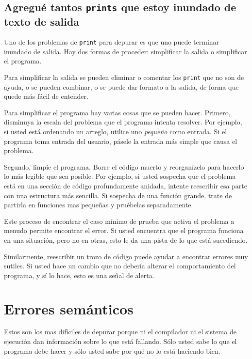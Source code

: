 \subsection{Agregué tantos \texttt{prints} que estoy inundado de texto de salida}

 

Uno de los problemas de \texttt{print} para depurar es que uno puede
terminar inundado de salida. Hay dos formas de proceder: simplificar
la salida o simplificar el programa.

Para simplificar la salida se pueden eliminar o comentar los \texttt{print}
que no son de ayuda, o se pueden combinar, o se puede dar formato
a la salida, de forma que quede más fácil de entender.

Para simplificar el programa hay varias cosas que se pueden hacer.
Primero, disminuya la escala del problema que el programa intenta
resolver. Por ejemplo, si usted está ordenando un arreglo, utilice
uno {\em pequeño} como entrada. Si el programa toma entrada del
usuario, pásele la entrada más simple que causa el problema.

Segundo, limpie el programa. Borre el código muerto y reorganízelo
para hacerlo lo más legible que sea posible. Por ejemplo, si usted
sospecha que el problema está en una sección de código profundamente
anidada, intente reescribir esa parte con una estructura más sencilla.
Si sospecha de una función grande, trate de partirla en funciones
mas pequeñas y pruébelas separadamente.

Este proceso de encontrar el caso mínimo de prueba que activa el problema
a menudo permite encontrar el error. Si usted encuentra que el programa
funciona en una situación, pero no en otras, esto le da una pista
de lo que está sucediendo.

Similarmente, reescribir un trozo de código puede ayudar a encontrar
errores muy sutiles. Si usted hace un cambio que no debería alterar
el comportamiento del programa, y sí lo hace, esto es una señal de
alerta.

\section{Errores semánticos}

 

Estos son los mas difíciles de depurar porque ni el compilador ni
el sistema de ejecución dan información sobre lo que está fallando.
Sólo usted sabe lo que el programa debe hacer y sólo usted sabe por
qué no lo está haciendo bien.

